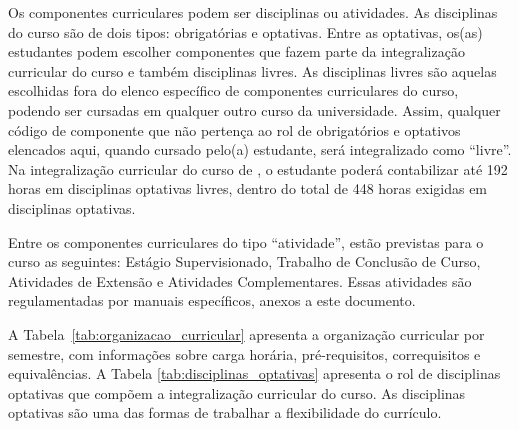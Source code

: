 Os componentes curriculares podem ser disciplinas ou atividades. As disciplinas do curso são de dois tipos: obrigatórias e optativas. Entre as optativas, os(as) estudantes podem escolher componentes que fazem parte da integralização curricular do curso e também disciplinas livres. As disciplinas livres são aquelas escolhidas fora do elenco específico de componentes curriculares do curso, podendo ser cursadas em qualquer outro curso da universidade. Assim, qualquer código de componente que não pertença ao rol de obrigatórios e optativos elencados aqui, quando cursado pelo(a) estudante, será integralizado como ``livre''. %
%
Na integralização curricular do curso de \nomedocurso, o estudante poderá contabilizar até 192 horas em disciplinas optativas livres, dentro do total de 448 horas exigidas em disciplinas optativas. 

Entre os componentes curriculares do tipo ``atividade'', estão previstas para o curso as seguintes: Estágio Supervisionado, Trabalho de Conclusão de Curso, Atividades de Extensão e Atividades Complementares. Essas atividades são regulamentadas por manuais específicos, anexos a este documento. 

A Tabela~\ref{tab:organizacao_curricular} apresenta a organização curricular por semestre, com informações sobre carga horária, pré-requisitos, correquisitos e equivalências. A Tabela \ref{tab:disciplinas_optativas} apresenta o rol de disciplinas optativas que compõem a integralização curricular do curso. As disciplinas optativas são uma das formas de trabalhar a flexibilidade do currículo.%


